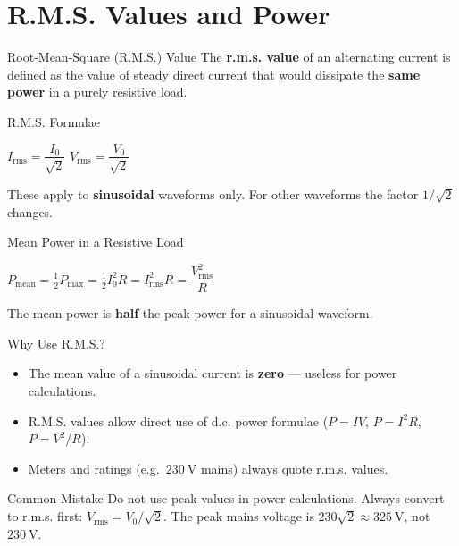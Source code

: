 \section{R.M.S. Values and Power}

\begin{definitionbox}{Root-Mean-Square (R.M.S.) Value}
The \textbf{r.m.s. value} of an alternating current is defined as the value of steady direct current that would dissipate the \textbf{same power} in a purely resistive load.
\end{definitionbox}

\begin{formulabox}{R.M.S. Formulae}
\begin{center}
\Large $I_{\text{rms}} = \dfrac{I_0}{\sqrt{2}}$ \qquad $V_{\text{rms}} = \dfrac{V_0}{\sqrt{2}}$
\end{center}
\vspace{0.3em}
These apply to \textbf{sinusoidal} waveforms only. For other waveforms the factor $1/\sqrt{2}$ changes.
\end{formulabox}

\begin{formulabox}{Mean Power in a Resistive Load}
\begin{center}
\large $P_{\text{mean}} = \tfrac{1}{2}P_{\text{max}} = \tfrac{1}{2}I_0^2 R = I_{\text{rms}}^2 R = \dfrac{V_{\text{rms}}^2}{R}$
\end{center}
\vspace{0.3em}
The mean power is \textbf{half} the peak power for a sinusoidal waveform.
\end{formulabox}

\begin{keybox}{Why Use R.M.S.?}
\begin{itemize}[itemsep=2pt]
  \item The mean value of a sinusoidal current is \textbf{zero} — useless for power calculations.
  \item R.M.S. values allow direct use of d.c. power formulae ($P = IV$, $P = I^2R$, $P = V^2/R$).
  \item Meters and ratings (e.g.\ $230\ \text{V}$ mains) always quote r.m.s. values.
\end{itemize}
\end{keybox}

\begin{warningbox}{Common Mistake}
Do not use peak values in power calculations. Always convert to r.m.s. first: $V_{\text{rms}} = V_0/\sqrt{2}$. The peak mains voltage is $230\sqrt{2} \approx 325\ \text{V}$, not $230\ \text{V}$.
\end{warningbox}

